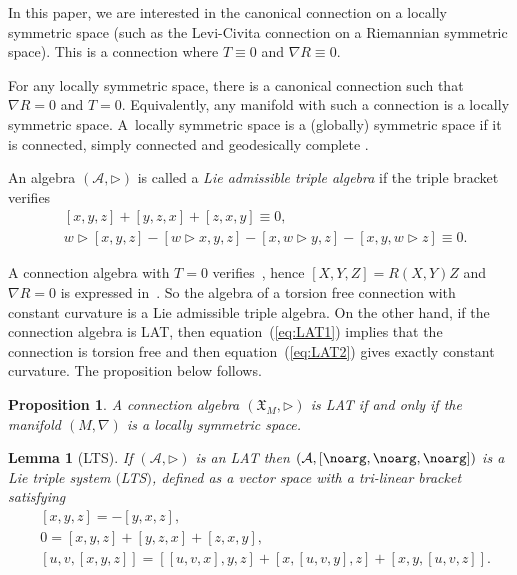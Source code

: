 \documentclass[pdftex]{sigma}
\numberwithin{equation}{section}
\newtheorem{Lemma}[Theorem]{Lemma}
\newtheorem{Proposition}[Theorem]{Proposition}
 { \theoremstyle{definition}
\newtheorem{Definition}[Theorem]{Definition}
\newtheorem{Note}[Theorem]{Note}
\newtheorem{Example}[Theorem]{Example}
\newtheorem{Remark}[Theorem]{Remark} }
\begin{document}
In this paper, we are interested in the canonical connection on a locally symmetric space (such as the Levi-Civita connection on a Riemannian symmetric space). This is a connection where $T \equiv 0$ and $\nabla R\equiv 0$.

\begin{Remark}
For any locally symmetric space, there is a canonical connection such that $\nabla R=0$ and $T=0$. Equivalently, any manifold with such a connection is a locally symmetric space. A~locally symmetric space is a (globally) symmetric space if it is connected, simply connected and geodesically complete \cite{Loos1, Nomizu_54}. %
\end{Remark}

\begin{Definition}[LAT] An algebra $(\mathcal{A},\rhd)$ is called a \emph{Lie admissible triple algebra}
if the triple bracket verifies
\begin{align}
&[x,y,z]+[y,z,x] + [z,x,y]\equiv 0,\label{eq:LAT1}\\
&w\rhd [x,y,z] - [w\rhd x,y,z] - [x,w\rhd y, z] - [x,y,w\rhd z]\equiv 0.\label{eq:LAT2}
\end{align}
\end{Definition}

A connection algebra with $T=0$ verifies~, hence $[X,Y,Z] = R(X,Y)Z$ and $\nabla R=0$
is expressed in~. So the algebra of a torsion free connection with constant curvature is a Lie admissible triple algebra. On the other hand, if the connection algebra is LAT, then equation~(\ref{eq:LAT1}) implies that the connection is torsion free and then equation~(\ref{eq:LAT2}) gives exactly constant curvature. The proposition below follows.

\begin{Proposition}
 A connection algebra $(\mathfrak{X}_M, \rhd)$ is LAT if and only if the manifold $(M,\nabla)$ is a locally symmetric space.
\end{Proposition}

\begin{Lemma}[LTS]\label{lemma:LTS} If $(\mathcal{A},\rhd)$ is an LAT then $(\mathcal{A},[\noarg,\noarg,\noarg])$ is a \emph{Lie triple system} $($LTS$)$, defined as a vector space with a tri-linear bracket satisfying
\begin{align}
&[x,y,z]= -[y,x,z],\label{eq:LTS1}\\
&0= [x,y,z] + [y,z,x] + [z,x,y] ,\label{eq:LTS2}\\
&[u,v,[x,y,z]]= [[u,v,x],y,z]+[x,[u,v,y],z] + [x,y,[u,v,z]] .\label{eq:LTS3}
\end{align}
\end{Lemma}
\end{document}
